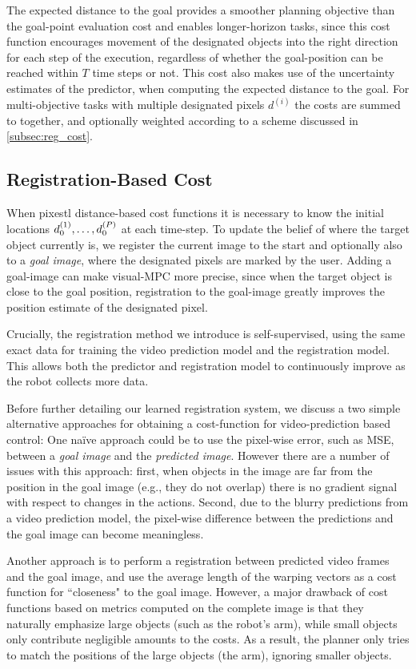 The expected distance to the goal provides a smoother planning objective than the goal-point evaluation cost and enables longer-horizon tasks, since this cost function encourages movement of the designated objects into the right direction for each step of the execution, regardless of whether the goal-position can be reached within $T$ time steps or not. This cost also makes use of the uncertainty estimates of the predictor, when computing the expected distance to the goal. For multi-objective tasks with multiple designated pixels $d^{(i)}$ the costs are summed to together, and optionally weighted according to a scheme discussed in \autoref{subsec:reg_cost}.  

\subsection{Registration-Based Cost}
\label{subsec:reg_cost}
When pixestl distance-based cost functions it is necessary to know the initial locations $d_0^{(1)}, \dots, d_0^{(P)}$ at each time-step. To update the belief of where the target object currently is, we register the current image to the start and optionally also to a \emph{goal image}, where the designated pixels are marked by the user. Adding a goal-image can make visual-MPC more precise, since when the target object is close to the goal position, registration to the goal-image greatly improves the position estimate of the designated pixel. 

Crucially, the registration method we introduce is self-supervised, using the same exact data for training the video prediction model and the registration model. This allows both the predictor and registration model to continuously improve as the robot collects more data.

Before further detailing our learned registration system, we discuss a two simple alternative approaches for obtaining a cost-function for video-prediction based control: One na\"{i}ve approach could be to use the pixel-wise error, such as MSE, between a \emph{goal image} and the \emph{predicted image}. However there are a number of issues with this approach: first, when objects in the image are far from the position in the goal image (e.g., they do not overlap) there is no gradient signal with respect to changes in the actions. Second, due to the blurry predictions from a video prediction model, the pixel-wise difference between the predictions and the goal image can become meaningless. 

Another approach is to perform a registration between predicted video frames and the goal image, and use the average length of the warping vectors as a cost function for ``closeness" to the goal image. However, a major drawback of cost functions based on metrics computed on the complete image is that they naturally emphasize large objects (such as the robot's arm), while small objects only contribute negligible amounts to the costs. As a result, the planner only tries to match the positions of the large objects (the arm), ignoring smaller objects.


